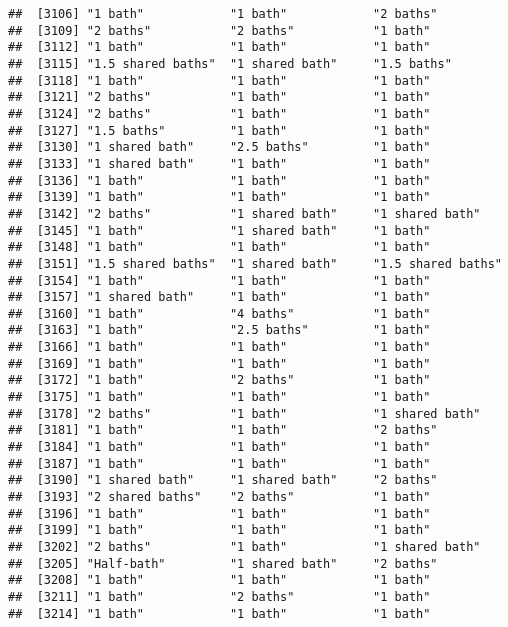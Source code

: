 \documentclass[
]{article}
\begin{document}
\begin{verbatim}
##  [3106] "1 bath"            "1 bath"            "2 baths"          
##  [3109] "2 baths"           "2 baths"           "1 bath"           
##  [3112] "1 bath"            "1 bath"            "1 bath"           
##  [3115] "1.5 shared baths"  "1 shared bath"     "1.5 baths"        
##  [3118] "1 bath"            "1 bath"            "1 bath"           
##  [3121] "2 baths"           "1 bath"            "1 bath"           
##  [3124] "2 baths"           "1 bath"            "1 bath"           
##  [3127] "1.5 baths"         "1 bath"            "1 bath"           
##  [3130] "1 shared bath"     "2.5 baths"         "1 bath"           
##  [3133] "1 shared bath"     "1 bath"            "1 bath"           
##  [3136] "1 bath"            "1 bath"            "1 bath"           
##  [3139] "1 bath"            "1 bath"            "1 bath"           
##  [3142] "2 baths"           "1 shared bath"     "1 shared bath"    
##  [3145] "1 bath"            "1 shared bath"     "1 bath"           
##  [3148] "1 bath"            "1 bath"            "1 bath"           
##  [3151] "1.5 shared baths"  "1 shared bath"     "1.5 shared baths" 
##  [3154] "1 bath"            "1 bath"            "1 bath"           
##  [3157] "1 shared bath"     "1 bath"            "1 bath"           
##  [3160] "1 bath"            "4 baths"           "1 bath"           
##  [3163] "1 bath"            "2.5 baths"         "1 bath"           
##  [3166] "1 bath"            "1 bath"            "1 bath"           
##  [3169] "1 bath"            "1 bath"            "1 bath"           
##  [3172] "1 bath"            "2 baths"           "1 bath"           
##  [3175] "1 bath"            "1 bath"            "1 bath"           
##  [3178] "2 baths"           "1 bath"            "1 shared bath"    
##  [3181] "1 bath"            "1 bath"            "2 baths"          
##  [3184] "1 bath"            "1 bath"            "1 bath"           
##  [3187] "1 bath"            "1 bath"            "1 bath"           
##  [3190] "1 shared bath"     "1 shared bath"     "2 baths"          
##  [3193] "2 shared baths"    "2 baths"           "1 bath"           
##  [3196] "1 bath"            "1 bath"            "1 bath"           
##  [3199] "1 bath"            "1 bath"            "1 bath"           
##  [3202] "2 baths"           "1 bath"            "1 shared bath"    
##  [3205] "Half-bath"         "1 shared bath"     "2 baths"          
##  [3208] "1 bath"            "1 bath"            "1 bath"           
##  [3211] "1 bath"            "2 baths"           "1 bath"           
##  [3214] "1 bath"            "1 bath"            "1 bath"           

\end{verbatim}
\end{document}
